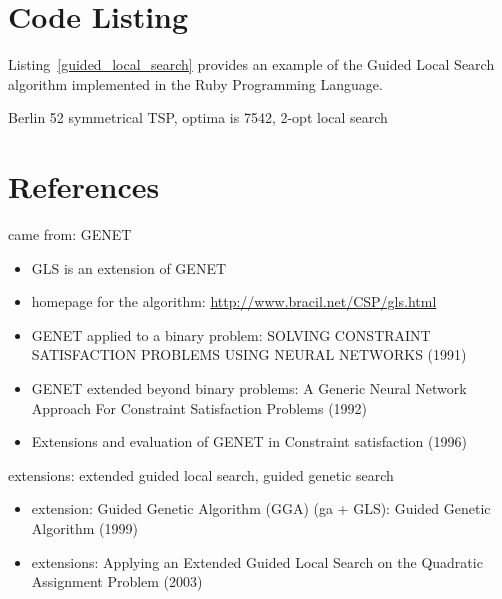 \documentclass[a4paper, 11pt]{article}
\begin{document}
\section{Code Listing}
\label{sec:code}
Listing~\ref{guided_local_search} provides an example of the Guided Local Search algorithm implemented in the Ruby Programming Language.

Berlin 52 symmetrical TSP, optima is 7542, 2-opt local search




\section{References}
\label{sec:references}

came from: GENET
\begin{itemize}
	\item GLS is an extension of GENET
	\item homepage for the algorithm: \url{http://www.bracil.net/CSP/gls.html}
	\item GENET applied to a binary problem: SOLVING CONSTRAINT SATISFACTION PROBLEMS USING NEURAL NETWORKS (1991)
	\item GENET extended beyond binary problems: A Generic Neural Network Approach For Constraint Satisfaction Problems (1992)
	\item Extensions and evaluation of GENET in Constraint satisfaction (1996)
\end{itemize}


extensions: extended guided local search, guided genetic search
\begin{itemize}
	\item extension: Guided Genetic Algorithm (GGA) (ga + GLS): Guided Genetic Algorithm (1999)
	\item extensions: Applying an Extended Guided Local Search on the Quadratic Assignment Problem (2003)
\end{itemize}
\end{document}
